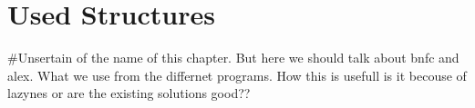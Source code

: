 \chapter{Used Structures}
\#Unsertain of the name of this chapter. But here we should talk about bnfc and
alex. What we use from the differnet programs. How this is usefull
is it becouse of lazynes or are the existing solutions good??
